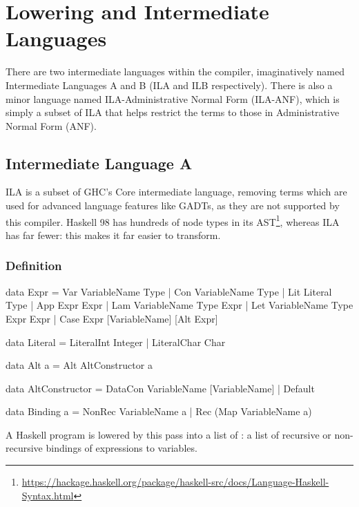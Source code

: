 \documentclass[dissertation.tex]{subfiles}
\begin{document}
\section{Lowering and Intermediate Languages}
{
    There are two intermediate languages within the compiler, imaginatively named Intermediate Languages A and B (ILA and ILB respectively). There is also a minor language named ILA-Administrative Normal Form (ILA-ANF), which is simply a subset of ILA that helps restrict the terms to those in Administrative Normal Form (ANF).

    \subsection{Intermediate Language A}
    {
        ILA is a subset of GHC's Core intermediate language, removing terms which are used for advanced language features like GADTs, as they are not supported by this compiler. Haskell 98 has hundreds of node types in its AST\footnote{\url{https://hackage.haskell.org/package/haskell-src/docs/Language-Haskell-Syntax.html}}, whereas ILA has far fewer: this makes it far easier to transform.

        \subsubsection{Definition}
        {
            \begin{haskellfigure}
            data Expr = Var VariableName Type
                      | Con VariableName Type
                      | Lit Literal Type
                      | App Expr Expr
                      | Lam VariableName Type Expr
                      | Let VariableName Type Expr Expr
                      | Case Expr [VariableName] [Alt Expr]

            data Literal = LiteralInt Integer
                         | LiteralChar Char

            data Alt a = Alt AltConstructor a

            data AltConstructor = DataCon VariableName [VariableName]
                                | Default

            data Binding a = NonRec VariableName a
                           | Rec (Map VariableName a)
            \end{haskellfigure}

            A Haskell program is lowered by this pass into a list of : a list of recursive or non-recursive bindings of expressions to variables.

}}}
\end{document}
